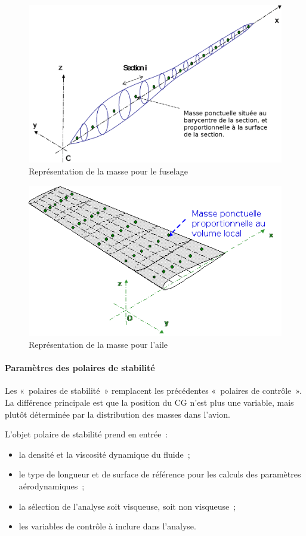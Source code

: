\documentclass[a4paper,twoside,12pt,dvips]{article}
\begin{document}
\begin{figure}[htbp]
  \centering
  \includegraphics[width=0.8\linewidth]{img-47-fr}
  \caption{Représentation de la masse pour le fuselage}
  \label{img:représentation_masse_fuselage}
\end{figure}

\begin{figure}[htbp]
  \centering
  \includegraphics[width=0.8\linewidth]{img-48-fr}
  \caption{Représentation de la masse pour l’aile}
  \label{img:représentation_masse_aile}
\end{figure}

\paragraph{Paramètres des polaires de stabilité}

Les «~polaires de stabilité~» remplacent les précédentes «~polaires de
contrôle~». La différence principale est que la position du CG n’est plus
une variable, mais plutôt déterminée par la distribution des masses dans
l’avion.

L’objet polaire de stabilité prend en entrée~:

\begin{itemize}
  \item la densité et la viscosité dynamique du fluide~;
  \item le type de longueur et de surface de référence pour les calculs
  des paramètres aérodynamiques~;
  \item la sélection de l’analyse soit visqueuse, soit non visqueuse~;
  \item les variables de contrôle à inclure dans l’analyse.
\end{itemize}
\end{document}
